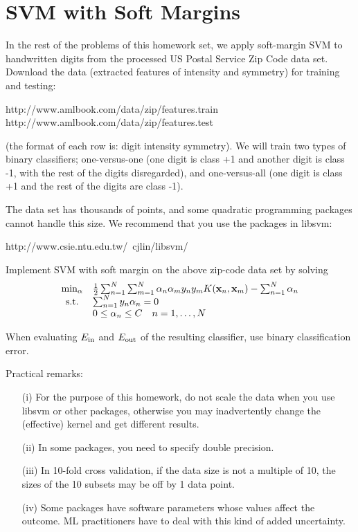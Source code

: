 \documentclass{article}
\newcommand{\tn}{\textnormal}
\begin{document}
\section{SVM with Soft Margins}

In the rest of the problems of this homework set, we apply soft-margin SVM to handwritten digits from the processed US Postal Service Zip Code data set. Download the data (extracted features of intensity and symmetry) for training and testing:

http://www.amlbook.com/data/zip/features.train
http://www.amlbook.com/data/zip/features.test

(the format of each row is: digit intensity symmetry). We will train two types of binary classifiers; one-versus-one (one digit is class +1 and another digit is class -1, with the rest of the digits disregarded), and one-versus-all (one digit is class +1 and the rest of the digits are class -1).

The data set has thousands of points, and some quadratic programming packages cannot handle this size. We recommend that you use the packages in libsvm:

http://www.csie.ntu.edu.tw/~cjlin/libsvm/

Implement SVM with soft margin on the above zip-code data set by solving
\[
	\begin{array}{cl}
		\min_\mathbf{\alpha} & \frac{1}{2} \sum_{n = 1}^N \sum_{m = 1}^N \alpha_n \alpha_m y_n y_m K(\mathbf{x}_n, \mathbf{x}_m) - \sum_{n = 1}^N \alpha_n \\
		\tn{s.t.} & \sum_{n = 1}^N y_n \alpha_n = 0 \\
		& 0 \leq \alpha_n \leq C \quad n = 1, \hdots, N
	\end{array}
\]

When evaluating $E_\tn{in}$ and $E_\tn{out}$ of the resulting classifier, use binary classification error.

Practical remarks:

\begin{enumerate}
	\item[(i)] For the purpose of this homework, do not scale the data when you use libsvm or other packages, otherwise you may inadvertently change the (effective) kernel and get different results.
	\item[(ii)] In some packages, you need to specify double precision.
	\item[(iii)] In 10-fold cross validation, if the data size is not a multiple of 10, the sizes of the 10 subsets may be off by 1 data point.
	\item[(iv)] Some packages have software parameters whose values affect the outcome. ML practitioners have to deal with this kind of added uncertainty.
\end{enumerate}
\end{document}
